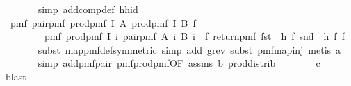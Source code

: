 \begin{isabellebody}
\ \ \ \ \ \ \isamarkupfalse%
\ {\isacharparenleft}{\kern0pt}simp\ add{\isacharcolon}{\kern0pt}comp{\isacharunderscore}{\kern0pt}def\ h{\isacharunderscore}{\kern0pt}h{\isacharunderscore}{\kern0pt}id{\isacharparenright}{\kern0pt}\ \isanewline
\ \ \ \ \isamarkupfalse%
\ {\isachardoublequoteopen}\ pmf\ {\isacharparenleft}{\kern0pt}pair{\isacharunderscore}{\kern0pt}pmf\ {\isacharparenleft}{\kern0pt}prod{\isacharunderscore}{\kern0pt}pmf\ I\ A{\isacharparenright}{\kern0pt}\ {\isacharparenleft}{\kern0pt}prod{\isacharunderscore}{\kern0pt}pmf\ I\ B{\isacharparenright}{\kern0pt}{\isacharparenright}{\kern0pt}\ f\ {\isacharequal}{\kern0pt}\isanewline
\ \ \ \ \ \ \ \ \ pmf\ {\isacharparenleft}{\kern0pt}prod{\isacharunderscore}{\kern0pt}pmf\ I\ {\isacharparenleft}{\kern0pt}{\isasymlambda}i{\isachardot}{\kern0pt}\ pair{\isacharunderscore}{\kern0pt}pmf\ {\isacharparenleft}{\kern0pt}A\ i{\isacharparenright}{\kern0pt}\ {\isacharparenleft}{\kern0pt}B\ i{\isacharparenright}{\kern0pt}{\isacharparenright}{\kern0pt}\ {\isasymbind}\ {\isacharparenleft}{\kern0pt}{\isasymlambda}f{\isachardot}{\kern0pt}\ return{\isacharunderscore}{\kern0pt}pmf\ {\isacharparenleft}{\kern0pt}fst\ {\isasymcirc}\ h\ f{\isacharcomma}{\kern0pt}\ snd\ {\isasymcirc}\ h\ f{\isacharparenright}{\kern0pt}{\isacharparenright}{\kern0pt}{\isacharparenright}{\kern0pt}\ f{\isachardoublequoteclose}\isanewline
\ \ \ \ \ \ \isamarkupfalse%
\ {\isacharparenleft}{\kern0pt}subst\ map{\isacharunderscore}{\kern0pt}pmf{\isacharunderscore}{\kern0pt}def{\isacharbrackleft}{\kern0pt}symmetric{\isacharbrackright}{\kern0pt}{\isacharcomma}{\kern0pt}\ simp\ add{\isacharcolon}{\kern0pt}\ g{\isacharunderscore}{\kern0pt}rev{\isacharcomma}{\kern0pt}\ subst\ pmf{\isacharunderscore}{\kern0pt}map{\isacharunderscore}{\kern0pt}inj{\isacharprime}{\kern0pt}{\isacharcomma}{\kern0pt}\ metis\ a{\isacharparenright}{\kern0pt}\isanewline
\ \ \ \ \ \ \isamarkupfalse%
\ {\isacharparenleft}{\kern0pt}simp\ add{\isacharcolon}{\kern0pt}pmf{\isacharunderscore}{\kern0pt}pair{\isacharprime}{\kern0pt}\ pmf{\isacharunderscore}{\kern0pt}prod{\isacharunderscore}{\kern0pt}pmf{\isacharbrackleft}{\kern0pt}OF\ assms{\isacharparenleft}{\kern0pt}{}{\isacharparenright}{\kern0pt}{\isacharbrackright}{\kern0pt}\ b\ prod{\isachardot}{\kern0pt}distrib{\isacharparenright}{\kern0pt}\isanewline
\ \ \ \ \ \ \isamarkupfalse%
\ c\ \isamarkupfalse%
\ blast\isanewline
\ \ \isamarkupfalse%
\isanewline
\ \ \isamarkupfalse%
\ \isamarkupfalse%

\end{isabellebody}
